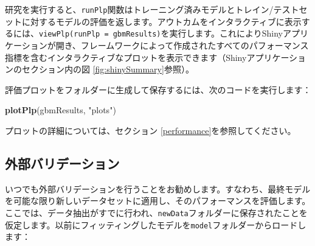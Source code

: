 \documentclass[
  11pt]{book}
\newenvironment{Shaded}{\begin{snugshade}}{\end{snugshade}}
\newcommand{\FunctionTok}[1]{\textcolor[rgb]{0.13,0.29,0.53}{\textbf{#1}}}
\newcommand{\NormalTok}[1]{#1}
\newcommand{\StringTok}[1]{\textcolor[rgb]{0.31,0.60,0.02}{#1}}
\theoremstyle{definition}
\theoremstyle{definition}
\theoremstyle{definition}
\theoremstyle{definition}
\theoremstyle{remark}
\begin{document}
研究を実行すると、\texttt{runPlp}関数はトレーニング済みモデルとトレイン/テストセットに対するモデルの評価を返します。アウトカムをインタラクティブに表示するには、\texttt{viewPlp(runPlp\ =\ gbmResults)}を実行します。これによりShinyアプリケーションが開き、フレームワークによって作成されたすべてのパフォーマンス指標を含むインタラクティブなプロットを表示できます（Shinyアプリケーションのセクション内の図 \ref{fig:shinySummary}参照）。

評価プロットをフォルダーに生成して保存するには、次のコードを実行します：

\begin{Shaded}
\begin{Highlighting}[]
\FunctionTok{plotPlp}\NormalTok{(gbmResults, }\StringTok{"plots"}\NormalTok{)}
\end{Highlighting}
\end{Shaded}

プロットの詳細については、セクション \ref{performance}を参照してください。

\subsection{外部バリデーション}\label{ux5916ux90e8ux30d0ux30eaux30c7ux30fcux30b7ux30e7ux30f3}

いつでも外部バリデーションを行うことをお勧めします。すなわち、最終モデルを可能な限り新しいデータセットに適用し、そのパフォーマンスを評価します。ここでは、データ抽出がすでに行われ、\texttt{newData}フォルダーに保存されたことを仮定します。以前にフィッティングしたモデルを\texttt{model}フォルダーからロードします：
\end{document}
